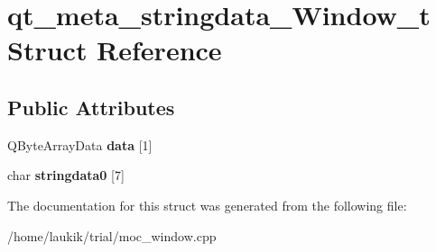 \hypertarget{structqt__meta__stringdata__Window__t}{}\section{qt\+\_\+meta\+\_\+stringdata\+\_\+\+Window\+\_\+t Struct Reference}
\label{structqt__meta__stringdata__Window__t}
\subsection*{Public Attributes}
\begin{DoxyCompactItemize}
\item 
\mbox{\label{structqt__meta__stringdata__Window__t_ab091aa5a4766cbce761abf42a7aa79ab}} 
Q\+Byte\+Array\+Data {\bfseries data} \mbox{[}1\mbox{]}
\item 
\mbox{\label{structqt__meta__stringdata__Window__t_a768469695521a8ce4b99abc74ffe8c10}} 
char {\bfseries stringdata0} \mbox{[}7\mbox{]}
\end{DoxyCompactItemize}


The documentation for this struct was generated from the following file\+:\begin{DoxyCompactItemize}
\item 
/home/laukik/trial/moc\+\_\+window.\+cpp\end{DoxyCompactItemize}
